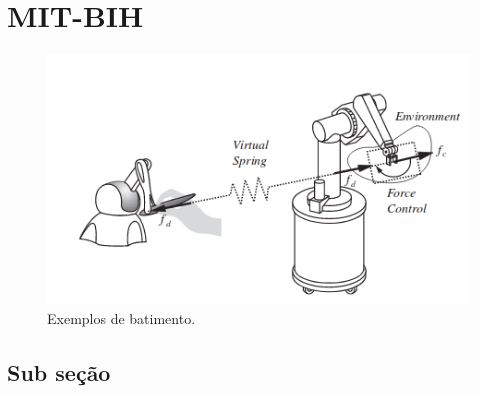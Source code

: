 \section{MIT-BIH}

\begin{figure}[htb]
	\begin{center}  
		\includegraphics[scale=0.6]{images/haptic.png}
	\end{center}
	\caption{Exemplos de batimento. }
	\label{fig_mitbih}
\end{figure}

\subsection{Sub seção}

